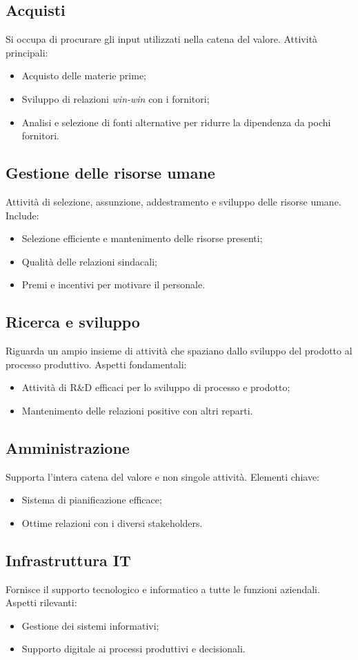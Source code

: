 \subsection{Acquisti}
Si occupa di procurare gli input utilizzati nella catena del valore.  
Attività principali:
\begin{itemize}
    \item Acquisto delle materie prime;
    \item Sviluppo di relazioni \emph{win-win} con i fornitori;
    \item Analisi e selezione di fonti alternative per ridurre la dipendenza da pochi fornitori.
\end{itemize}

\subsection{Gestione delle risorse umane}
Attività di selezione, assunzione, addestramento e sviluppo delle risorse umane.  
Include:
\begin{itemize}
    \item Selezione efficiente e mantenimento delle risorse presenti;
    \item Qualità delle relazioni sindacali;
    \item Premi e incentivi per motivare il personale.
\end{itemize}

\subsection{Ricerca e sviluppo}
Riguarda un ampio insieme di attività che spaziano dallo sviluppo del prodotto al processo produttivo.  
Aspetti fondamentali:
\begin{itemize}
    \item Attività di R\&D efficaci per lo sviluppo di processo e prodotto;
    \item Mantenimento delle relazioni positive con altri reparti.
\end{itemize}

\subsection{Amministrazione}
Supporta l’intera catena del valore e non singole attività.  
Elementi chiave:
\begin{itemize}
    \item Sistema di pianificazione efficace;
    \item Ottime relazioni con i diversi stakeholders.
\end{itemize}

\subsection{Infrastruttura IT}
Fornisce il supporto tecnologico e informatico a tutte le funzioni aziendali.  
Aspetti rilevanti:
\begin{itemize}
    \item Gestione dei sistemi informativi;
    \item Supporto digitale ai processi produttivi e decisionali.
\end{itemize}